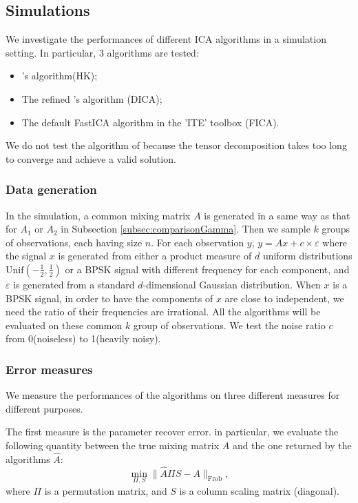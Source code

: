 \documentclass[twoside]{article}
\theoremstyle{definition}
\newcommand{\eps}{\varepsilon}
\begin{document}
\subsection{Simulations}
We investigate the performances of different ICA algorithms in a simulation setting. In particular, 3 algorithms are tested: 
\begin{itemize}
\item \citet{DHsu2012}'s algorithm(HK);
\item The refined \citet{DHsu2012}'s algorithm (DICA);
\item The default FastICA algorithm in the 'ITE' toolbox \cite{szabo12separation} (FICA). 
\end{itemize}
We do not test the algorithm of \citep{anandkumar2012tensordecomposition} because the tensor decomposition takes too long to converge and achieve a valid solution. 
\subsubsection{Data generation}
In the simulation, a common mixing matrix $A$ is generated in a same way as that for $A_1$ or $A_2$ in Subsection \ref{subsec:comparisonGamma}. 
Then we sample $k$ groups of observations, each having size $n$. 
For each observation $y$, $y = Ax+ c\times\eps$ where the signal $x$ is generated from either a product measure of $d$ uniform distributions $\text{Unif}(-\frac12, \frac12)$ or a BPSK signal with different frequency for each component, and $\eps$ is generated from a standard $d$-dimensional Gaussian distribution. 
When $x$ is a BPSK signal, in order to have the components of $x$ are close to independent, we need the ratio of their frequencies are irrational.
All the algorithms will be evaluated on these common $k$ group of observations.
We test the noise ratio $c$ from 0(noiseless) to 1(heavily noisy). 
\subsubsection{Error measures}
We measure the performances of the algorithms on three different measures for different purposes.

The first measure is the parameter recover error. in particular, we evaluate the following quantity between the true mixing matrix $A$ and the one returned by the algorithms $\widehat{A}$:
\begin{equation}
\label{equ:parerror}
\min_{\Pi,S} \|\widehat{A}\Pi S - A\|_{\text{Frob}},
\end{equation}
where $\Pi$ is a permutation matrix, and $S$ is a column scaling matrix (diagonal).
\end{document}
